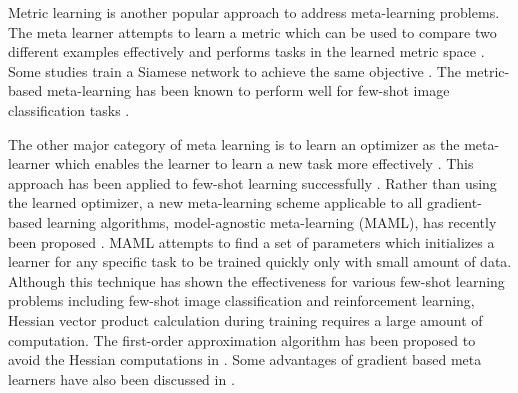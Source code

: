 \documentclass{article}
\begin{document}
Metric learning is another popular approach to address meta-learning problems. The meta learner attempts to
learn a metric which can be used to compare two different examples effectively and performs tasks in the learned metric space \cite{Vinyals:nips2016:DBLP:conf/nips/VinyalsBLKW16}. Some studies train a Siamese network to achieve the same objective \cite{Koch:icmlw2015:DBLP:conf/icml/ShyamGD17}. The metric-based meta-learning has been known to perform well for few-shot image classification tasks \cite{Snell:nips2017:DBLP:conf/nips/SnellSZ17, Shyam:icml2017:DBLP:conf/icml/ShyamGD17}.


The other major category of meta learning is to learn an optimizer 
as the meta-learner which enables the learner to learn a new task more effectively \cite{Hochreiter:2001:DBLP:conf/icann/HochreiterYC01, Andrychowicz:nips2016:DBLP:conf/nips/AndrychowiczDCH16}. 
This approach has been applied to few-shot learning successfully \cite{ravi:opt_fewshot:DBLP:conf/iclr/RaviL17}. 
Rather than using the learned optimizer, a new meta-learning scheme applicable 
to all gradient-based learning algorithms, model-agnostic meta-learning (MAML), has recently been proposed \cite{finn:maml:DBLP:conf/icml/FinnAL17}. MAML attempts to find a set of parameters which initializes 
a learner for any specific task to be trained quickly only with small amount of data. 
Although this technique has shown the effectiveness for various few-shot learning problems including few-shot image classification and reinforcement learning, Hessian vector product calculation during training requires a 
large amount of computation. The first-order approximation algorithm has been proposed to avoid the Hessian computations in \cite{nichol:reptile:DBLP:journals/corr/abs-1803-02999}. Some advantages of gradient based meta learners have also
been discussed in \cite{finn:universality_maml:DBLP:/journals/corr/abs-1710-11622}.
\end{document}
